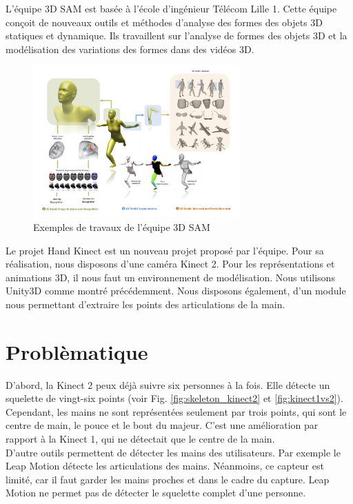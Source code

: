 L'équipe 3D SAM est basée à l'école d'ingénieur Télécom Lille 1. 
Cette équipe conçoit de nouveaux outils et méthodes d'analyse des 
formes des objets 3D statiques et dynamique. Ils travaillent sur 
l'analyse de formes des objets 3D et la modélisation des variations 
des formes dans des vidéos 3D.

\begin{figure}[H]
  \begin{center}
    \includegraphics[width=300px]{images/accueil-illus.jpg}
    \caption{Exemples de travaux de l'équipe 3D SAM}
  \end{center}
\end{figure}

Le projet \og Hand Kinect \fg est un nouveau projet proposé par 
l'équipe.
Pour sa réalisation, nous disposons d'une caméra Kinect 2. 
Pour les représentations et animations 3D, il nous faut un environnement 
de modélisation. Nous utilisons Unity3D comme montré précédemment. 
Nous disposons également, d'un module nous permettant d'extraire les 
points des articulations de la main.

\section{Problèmatique}
D'abord, la Kinect 2 peux déjà suivre six personnes à la fois. Elle 
détecte un squelette de vingt-six points (voir Fig. 
\ref{fig:skeleton_kinect2} et \ref{fig:kinect1vs2}). Cependant, les 
mains ne sont représentées seulement par trois points, qui sont le centre de 
main, le pouce et le bout du majeur. C'est une amélioration par 
rapport à la Kinect 1, qui ne détectait que le centre de la main.\\

D'autre outils permettent de détecter les mains des utilisateurs. Par exemple 
le Leap Motion détecte les articulations des mains. Néanmoins,
ce capteur est limité, car il faut garder les mains proches et dans le 
cadre du capture. Leap Motion ne permet pas de détecter le squelette complet
d'une personne.\\


